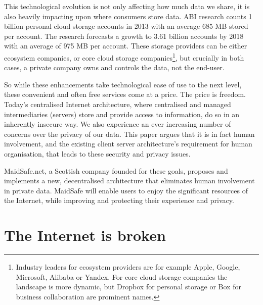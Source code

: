 \documentclass[twocolumn,english]{article}
\begin{document}
This technological evolution is not only affecting how much data we
share, it is also heavily impacting upon where consumers store data.
ABI research counts 1 billion personal cloud storage accounts in 2013 with an average 685 MB stored per account.  The research forecasts a growth to 3.61 billion accounts by 2018 with an average of 975 MB per account\cite{abi13}. %
These storage providers can be either ecosystem companies, or core cloud storage companies\footnote{Industry leaders for ecosystem providers are for example Apple, Google, Microsoft, Alibaba or Yandex. For core cloud storage companies the landscape is more dynamic, but Dropbox for personal storage or Box for business collaboration are prominent names.}, but crucially in both cases, a private company owns and controls the data, not the end-user.

So while these enhancements take technological ease of use to the next
level, these convenient and often free services come at a price. The
price is freedom. Today\textquoteright s centralised Internet architecture,
where centralised and managed intermediaries (servers) store and provide
access to information, do so in an inherently insecure way. We also
experience an ever increasing number of concerns over the privacy
of our data. This paper argues that it is in fact human involvement,
and the existing client server architecture\textquoteright s requirement
for human organisation, that leads to these security and privacy issues.

MaidSafe.net, a Scottish company founded for these goals, proposes and implements a new, decentralised architecture that eliminates human involvement in private data.  MaidSafe will enable users to enjoy the significant resources of the Internet, while improving and protecting their experience and privacy.


\section{The Internet is broken}
\end{document}
